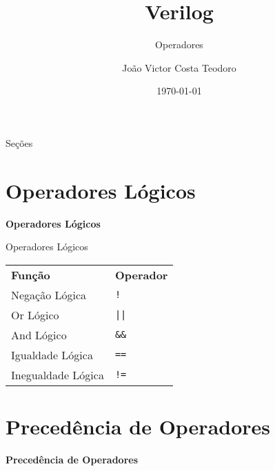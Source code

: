 \documentclass[aspectratio=169,xcolor=dvipsnames]{beamer}
\title{Verilog}
\subtitle{Operadores}
\author{João Victor Costa Teodoro}
\institute
{
    Poliware \\
    Escola Politécnica da Universidade de São Paulo
}
\date{\today}
\begin{document}
\begin{frame}
    \titlepage
\end{frame}

\begin{frame}{Seções}
    \tableofcontents
\end{frame}

\section{Operadores Lógicos}

\begin{frame}
    \Huge{\centerline{\textbf{Operadores Lógicos}}}
\end{frame}

\begin{frame}[fragile]{Operadores Lógicos}
\begin{tabular}{ll}
\textbf{Função} & \textbf{Operador} \\
Negação Lógica & \texttt{!} \\
Or Lógico      & \texttt{||} \\
And Lógico     & \texttt{\&\&} \\
Igualdade Lógica & \texttt{==} \\
Inegualdade Lógica & \texttt{!=} \\
\end{tabular}
\end{frame}

\section{Precedência de Operadores}

\begin{frame}
    \Huge{\centerline{\textbf{Precedência de Operadores}}}
\end{frame}
\end{document}
